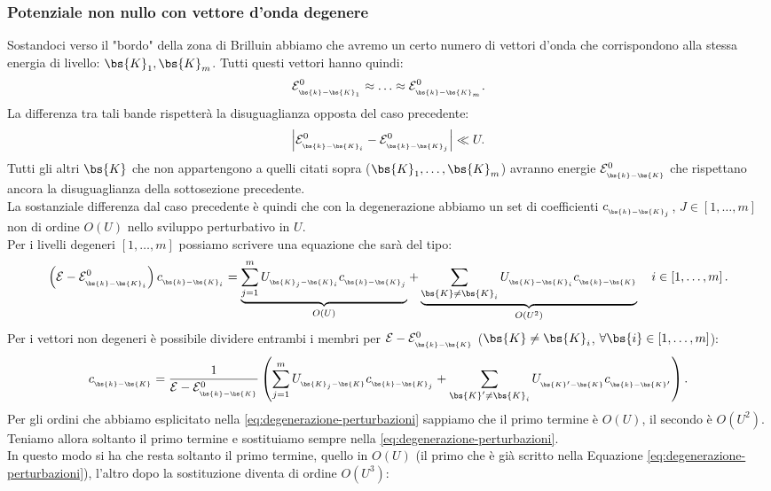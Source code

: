 \subsubsection{Potenziale non nullo con vettore d'onda degenere}
\label{subsubsec:Potenziale-non-nullo-con-vettore-dondadegenere}
Sostandoci verso il "bordo" della zona di Brilluin abbiamo che avremo un certo numero di vettori d'onda che corrispondono alla stessa energia di livello: $\bs{K}_1, \bs{K}_m$. Tutti questi vettori hanno quindi:
\[
	\mathcal{E}^0_{_{\bs{k}-\bs{K}_1}} \approx
	\ldots
	\approx
	\mathcal{E}^0_{_{\bs{k}-\bs{K}_m}}
.\] 
La differenza tra tali bande rispetterà la disuguaglianza opposta del caso precedente:
\[
	\left| \mathcal{E}^0_{_{\bs{k}-\bs{K}_i}} 
	-
	\mathcal{E}^0_{_{\bs{k}-\bs{K}_j}} \right| 
	\ll U
.\] 
Tutti gli altri $\bs{K}$ che non appartengono a quelli citati sopra ($\bs{K}_1, \ldots, \bs{K}_m$) avranno energie $\mathcal{E}^0_{_{\bs{k}-\bs{K}}}$ che rispettano ancora la disuguaglianza della sottosezione precedente.\\
La sostanziale differenza dal caso precedente è quindi che con la degenerazione abbiamo un set di coefficienti $c_{_{\bs{k}-\bs{K}_j}}$, $J \in [1,\ldots, m] $ non di ordine $O(U)$ nello sviluppo perturbativo in $U$. \\
Per i livelli degeneri $\left[ 1,\ldots,m \right] $ possiamo scrivere una equazione che sarà del tipo:
\[
	\left( \mathcal{E}  - \mathcal{E}^0_{_{\bs{k}-\bs{K}_i}} \right) 
	c_{_{\bs{k}-\bs{K}_i}} 
	=
	\underbrace{
	\sum_{j = 1}^{m} U_{_{\bs{K}_j-\bs{K}_i}}c_{_{\bs{k}-\bs{K}_j}}
	}_{O(U)}
	+
	\underbrace{
	\sum_{\bs{K} \neq \bs{K}_i}^{}
	U_{_{\bs{K}-\bs{K}_i}}c_{_{\bs{k}-\bs{K}}}
	}_{O(U^2)}
	\quad
	i \in \left[ 1,\ldots,m \right] 
	\label{eq:degenerazione-perturbazioni}
.\]
Per i vettori non degeneri è possibile dividere entrambi i membri per $\mathcal{E}-\mathcal{E}^0_{_{\bs{k}-\bs{K}}}$ ($\bs{K} \neq \bs{K}_i$, $\forall \bs{i} \in \left[ 1,\ldots,m \right] $):
\[
	c_{_{\bs{k}-\bs{K}}} =
	\frac{1}{\mathcal{E}-\mathcal{E}^0_{_{\bs{k}-\bs{K}}}}
	\left( \sum_{j=1}^{m} U_{_{\bs{K}_j-\bs{K}}}c_{_{\bs{k}-\bs{K}_j}} 
	+
	\sum_{\bs{K}' \neq \bs{K}_i}^{} U_{_{\bs{K}'-\bs{K}}}c_{_{\bs{k}-\bs{K}'}}	
	\right) 
.\] 
Per gli ordini che abbiamo esplicitato nella \ref{eq:degenerazione-perturbazioni} sappiamo che il primo termine è $O(U)$, il secondo è $O(U^2)$. Teniamo allora soltanto il primo termine e sostituiamo sempre nella \ref{eq:degenerazione-perturbazioni}. \\
In questo modo si ha che resta soltanto il primo termine, quello in $O(U)$ (il primo che è già scritto nella Equazione \ref{eq:degenerazione-perturbazioni}), l'altro dopo la sostituzione diventa di ordine $O(U^3)$:
